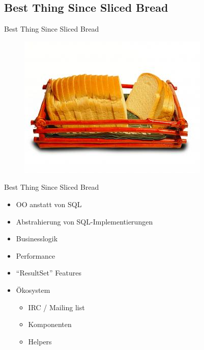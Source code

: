 \subsection{Best Thing Since Sliced Bread}

\begin{frame}{Best Thing Since Sliced Bread}


\begin{figure}[!ht]
\centering
\includegraphics[width=1\linewidth]{img/sliced-bread.jpg}
\end{figure}
\end{frame}

\begin{frame}{Best Thing Since Sliced Bread}
\begin{itemize}
\item OO anstatt von SQL
\item Abstrahierung von SQL-Implementierungen
\item Businesslogik
\item Performance
\item ``ResultSet'' Features
\item Ökosystem
\begin{itemize}
\item IRC / Mailing list
\item Komponenten
\item Helpers
\end{itemize}
\end{itemize}
\end{frame}

